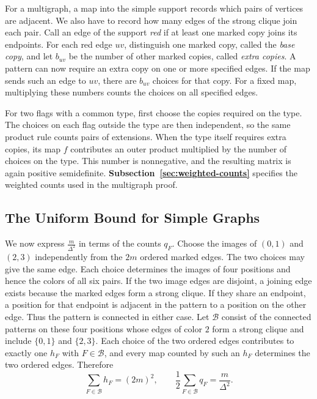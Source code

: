 For a multigraph, a map into the simple support records which pairs
of vertices are adjacent. We also have to record how many edges of
the strong clique join each pair. Call an edge of the support
\emph{red} if at least one marked copy joins its endpoints. For each
red edge $uv$, distinguish one marked copy, called the \emph{base
copy}, and let $b_{uv}$ be the number of other marked copies, called
\emph{extra copies}. A pattern can now require an extra copy on one
or more specified edges. If the map sends such an edge to $uv$, there
are $b_{uv}$ choices for that copy. For a fixed map, multiplying
these numbers counts the choices on all specified edges.

For two flags with a common type, first choose the copies required
on the type. The choices on each flag outside the type are then
independent, so the same product rule counts pairs of extensions.
When the type itself requires extra copies, its map $f$ contributes
an outer product multiplied by the number of choices on the type.
This number is nonnegative, and the resulting matrix is again positive
semidefinite. \textbf{Subsection~\ref{sec:weighted-counts}} specifies
the weighted counts used in the multigraph proof.

\subsection{The Uniform Bound for Simple Graphs}\label{subsec:marked-edge-pairs}

We now express $\frac{m}{\Delta^2}$ in terms of the counts $q_F$.
Choose the images of $(0,1)$ and $(2,3)$ independently from the $2m$
ordered marked edges. The two choices may give the same edge. Each
choice determines the images of four positions and hence the colors of
all six pairs. If the two image edges are disjoint, a joining edge
exists because the marked edges form a strong clique. If they share
an endpoint, a position for that endpoint is adjacent in the pattern
to a position on the other edge. Thus the pattern is connected in
either case. Let $\mathcal B$ consist of the connected patterns on
these four positions whose edges of color $2$ form a strong clique
and include $\{0,1\}$ and $\{2,3\}$. Each choice of the two ordered
edges contributes to exactly one $h_F$ with $F\in\mathcal B$, and
every map counted by such an $h_F$ determines the two ordered edges.
Therefore
\[
 \sum_{F\in\mathcal B}h_F=(2m)^2,\qquad
 \frac{1}{2}\sum_{F\in\mathcal B}q_F=\frac{m}{\Delta^2}.
\]

